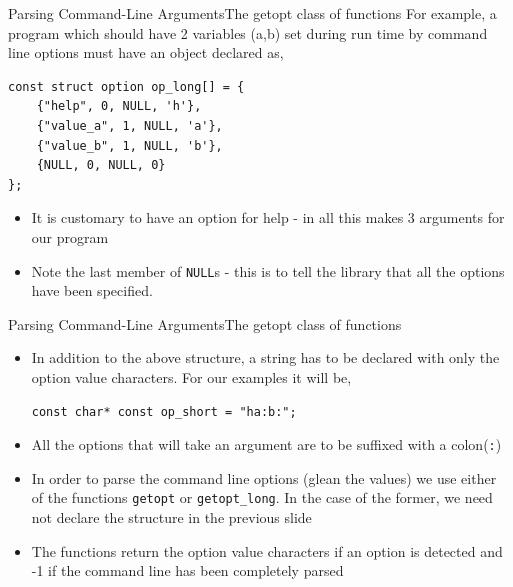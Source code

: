 \documentclass{beamer}
\begin{document}
\begin{frame}[fragile]{Parsing Command-Line Arguments}{The getopt class of functions}
For example, a program which should have 2 variables (a,b) set during run time by command line options must have an object declared as,
\begin{verbatim}
const struct option op_long[] = {
    {"help", 0, NULL, 'h'},
    {"value_a", 1, NULL, 'a'},
    {"value_b", 1, NULL, 'b'},
    {NULL, 0, NULL, 0}
};
\end{verbatim}
\begin{itemize}
\item It is customary to have an option for help - in all this makes 3 arguments for our program
\item Note the last member of \verb|NULL|s - this is to tell the library that all the options have been specified.
\end{itemize}
\end{frame}

\begin{frame}[fragile]{Parsing Command-Line Arguments}{The getopt class of functions}
\begin{itemize}
\item In addition to the above structure, a string has to be declared with only the option value characters. For our examples it will be,
\begin{verbatim}
const char* const op_short = "ha:b:";
\end{verbatim}
\item All the options that  will take an argument are to be suffixed with a colon(\verb|:|)
\item In order to parse the command line options (glean the values) we use either of the functions \verb|getopt| or \verb|getopt_long|. In the case of the former, we need not declare the structure in the previous slide
\item The functions return the option value characters if an option is detected and -1 if the command line has been completely parsed
\end{itemize}
\end{frame}
\end{document}
